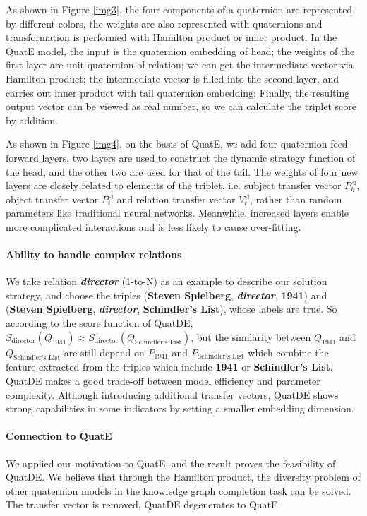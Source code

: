 \documentclass[letterpaper]{article} \usepackage{aaai20}  \usepackage{times}  \usepackage{helvet} \usepackage{courier}  \usepackage[hyphens]{url}  \usepackage{graphicx} \usepackage{lineno,hyperref,amsmath,amssymb}
\begin{document}
As shown in Figure \ref{img3}, the four components of a quaternion are represented by different colors, the weights are also represented with quaternions and transformation is performed with Hamilton product or inner product. In the QuatE model, the input is the quaternion embedding of head; the weights of the first layer are unit quaternion of relation; we can get the intermediate vector via Hamilton product; the intermediate vector is filled into the second layer, and carries out inner product with tail quaternion embedding; Finally, the resulting output vector can be viewed as real number, so we can calculate the triplet score by addition. 

As shown in Figure \ref{img4}, on the basis of QuatE, we add four quaternion feed-forward layers, two layers are used to construct the dynamic strategy function of the head, and the other two are used for that of the tail. The weights of four new layers are closely related to elements of the triplet, i.e. subject transfer vector $P_h^{\triangleleft}$, object transfer vector $P_t^{\triangleleft}$ and relation transfer vector $V_r^{\triangleleft}$, rather than random parameters like traditional neural networks. Meanwhile, increased layers enable more complicated interactions and is less likely to cause over-fitting.

\paragraph{\textbf{Ability to handle complex relations}}We take relation \textbf{\textit{director}} (1-to-N) as an example to describe our solution strategy, and choose the triples (\textbf{Steven Spielberg}, \textbf{\textit{director}}, \textbf{1941}) and (\textbf{Steven Spielberg}, \textbf{\textit{director}}, \textbf{Schindler’s List}), whose labels are true. So according to the score function of QuatDE, $S_{ \text{director}} (Q_{\text{1941}}) \approx S_{ \text{director}} (Q_{ \text{Schindler’s List}})$, but the similarity between $Q_{ \text{1941}}$ and $Q_{\text{Schindler’s List}}$ are still depend on  $P_{\text{1941}}$ and $P_{\text{Schindler’s List}}$ which combine the feature extracted from the triples which include \textbf{1941} or \textbf{Schindler’s List}. QuatDE makes a good trade-off between model efficiency and parameter complexity. Although introducing additional transfer vectors, QuatDE shows strong capabilities in some indicators by setting a smaller embedding dimension.

\paragraph{\textbf{Connection to QuatE}}We applied our motivation to QuatE, and the result proves the feasibility of QuatDE. We believe that through the Hamilton product, the diversity problem of other quaternion models in the knowledge graph completion task can be solved. The transfer vector is removed, QuatDE degenerates to QuatE.
\end{document}
